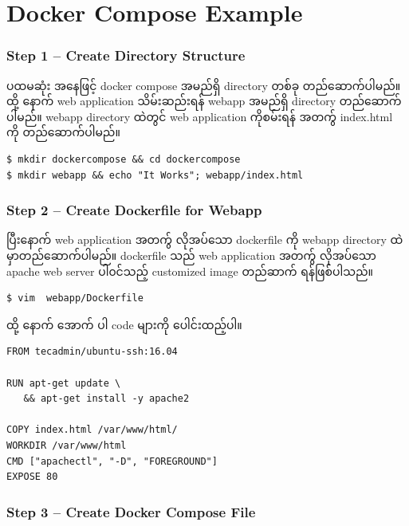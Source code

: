 \documentclass{article}
\begin{document}
\pagebreak

\section{Docker Compose Example}\label{docker-compose-example}

\subsubsection{Step 1 -- Create Directory
Structure}\label{step-1-create-directory-structure}

ပထမဆုံး အနေဖြင့် docker compose အမည်ရှိ directory တစ်ခု တည်ဆောက်ပါမည်။
ထို့ နောက် web application သိမ်းဆည်းရန် webapp အမည်ရှိ directory
တည်ဆောက်ပါမည်။ webapp directory ထဲတွင် web application ကိုစမ်းရန် အတက်ွ
index.html ကို တည်ဆောက်ပါမည်။

\begin{verbatim}
$ mkdir dockercompose && cd dockercompose
$ mkdir webapp && echo "It Works"; webapp/index.html
\end{verbatim}

\subsubsection{Step 2 -- Create Dockerfile for
Webapp}\label{step-2-create-dockerfile-for-webapp}

ပြီးနောက် web application အတက်ွ လိုအပ်သော dockerfile ကို webapp
directory ထဲမှာတည်ဆောက်ပါမည်။ dockerfile သည် web application အတက်ွ
လိုအပ်သော apache web server ပါ၀င်သည့် customized image တည်ဆာက်
ရန်ဖြစ်ပါသည်။

\begin{verbatim}
$ vim  webapp/Dockerfile
\end{verbatim}

ထို့ နောက် အောက် ပါ code များကို ပေါင်းထည့်ပါ။

\begin{verbatim}
FROM tecadmin/ubuntu-ssh:16.04

RUN apt-get update \
   && apt-get install -y apache2

COPY index.html /var/www/html/
WORKDIR /var/www/html
CMD ["apachectl", "-D", "FOREGROUND"]
EXPOSE 80
\end{verbatim}

\subsubsection{Step 3 -- Create Docker Compose
File}\label{step-3-create-docker-compose-file}
\end{document}
